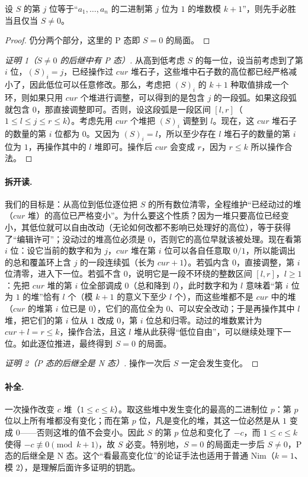 \begin{theorem}[Nim-k 判定]\label{thm:nimk}
设 $S$ 的第 $j$ 位等于“$a_1,\ldots,a_n$ 的二进制第 $j$ 位为 $1$ 的堆数模 $k+1$”，则先手必胜当且仅当 $S\ne0$。
\end{theorem}
\begin{proof}
仍分两个部分，这里的 P 态即 $S=0$ 的局面。
\end{proof}

\begin{proof}[证明 1（$S\ne0$ 的后继中有 P 态）]
从高到低考虑 $S$ 的每一位，设当前考虑到了第 $i$ 位，$(S)_i=j$，已经操作过 $cur$ 堆石子，这些堆中石子数的高位都已经严格减小了，因此低位可以任意修改。那么，考虑把 $(S)_i$ 的 $k+1$ 种取值排成一个环，则如果只用 $cur$ 个堆进行调整，可以得到的是包含 $j$ 的一段弧。如果这段弧就包含 $0$，那直接调整即可。否则，设这段弧是一段区间 $[l,r]$（$1\le l\le j\le r\le k$）。考虑先用 $cur$ 个堆把 $(S)_i$ 调整到 $l$。现在，这 $cur$ 堆石子的数量的第 $i$ 位都为 $0$。又因为 $(S)_i=l$，所以至少存在 $l$ 堆石子的数量的第 $i$ 位为 $1$，再操作其中的 $l$ 堆即可。操作后 $cur$ 会变成 $r$，因为 $r\le k$ 所以操作合法。
\end{proof}

\paragraph{拆开读.} 我们的目标是：从高位到低位逐位把 $S$ 的所有数位清零，全程维护“已经动过的堆（$cur$ 堆）的高位已严格变小”。为什么要这个性质？因为一堆只要高位已经变小，其低位就可以自由改动（无论如何改都不影响已处理好的高位），等于获得了“编辑许可”；没动过的堆高位必须是 $0$，否则它的高位早就该被处理。现在看第 $i$ 位：设它当前的数字和为 $j$，$cur$ 堆在第 $i$ 位可以各自任意取 $0/1$，所以能调出的总和覆盖环上含 $j$ 的一段连续弧（长为 $cur+1$）。若弧内含 $0$，直接调整，第 $i$ 位清零，进入下一位。若弧不含 $0$，说明它是一段不环绕的整数区间 $[l,r]$，$l\ge1$：先把 $cur$ 堆的第 $i$ 位全部调成 $0$（总和降到 $l$），此时数字和为 $l$ 意味着“第 $i$ 位为 $1$ 的堆”恰有 $l$ 个（模 $k+1$ 的意义下至少 $l$ 个），而这些堆都不是 $cur$ 中的堆（$cur$ 的堆第 $i$ 位已是 $0$），它们的高位全为 $0$、可以安全改动；于是再操作其中 $l$ 堆，把它们的第 $i$ 位从 $1$ 改成 $0$，第 $i$ 位总和归零。动过的堆数累计为 $cur+l=r\le k$，操作合法，且这 $l$ 堆从此获得“低位自由”，可以继续处理下一位。如此逐位推进，最终得到 $S=0$ 的局面。

\begin{proof}[证明 2（P 态的后继全是 N 态）]
操作一次后 $S$ 一定会发生变化。
\end{proof}
\paragraph{补全.} 一次操作改变 $c$ 堆（$1\le c\le k$）。取这些堆中发生变化的最高的二进制位 $p$：第 $p$ 位以上所有堆都没有变化；而在第 $p$ 位，凡是变化的堆，其这一位必然是从 $1$ 变成 $0$——否则这堆的值不会变小。因此 $S$ 的第 $p$ 位总和变化了 $-c$，而 $1\le c\le k$ 使得 $-c\not\equiv0\pmod{k+1}$，故 $S$ 必变。特别地，$S=0$ 的局面走一步后 $S\ne0$，P 态的后继全是 N 态。这个“看最高变化位”的论证手法也适用于普通 Nim（$k=1$、模 $2$），是理解后面许多证明的钥匙。

